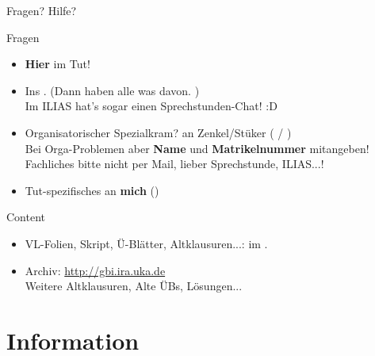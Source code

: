 \begin{frame}{Fragen? Hilfe?}	
	\begin{block}{Fragen}
		\begin{itemize}
			\item \textbf{Hier} im Tut!
			\item Ins \ILIAS. (Dann haben alle was davon. \smiley) \\
				  Im ILIAS hat's sogar einen Sprechstunden-Chat! :D
			\pause
			\item Organisatorischer Spezialkram? \impl an Zenkel/Stüker ( / ) \\
			Bei Orga-Problemen aber \textbf{Name} und \textbf{Matrikelnummer}  mitangeben! \\
			Fachliches bitte nicht per Mail, lieber \impl Sprechstunde, ILIAS...!
			\item Tut-spezifisches an \textbf{mich} (\mailto{\mymail})
		\end{itemize}
	\end{block}
	\pause
	\begin{block}{Content}
		\begin{itemize}
			\item VL-Folien, Skript, Ü-Blätter, Altklausuren...: im \ILIAS.
			\item Archiv: \url{http://gbi.ira.uka.de} \\
			Weitere Altklausuren, Alte ÜBs, Lösungen...
		\end{itemize}
	\end{block}
\end{frame}


\section{Information}

